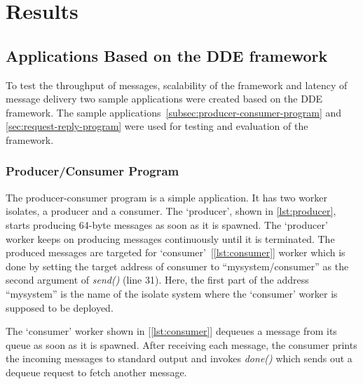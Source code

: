 \chapter{Results}
\label{chapter:results}

\section{Applications Based on the DDE framework}
\label{sec:result-applications}
  To test the throughput of messages, scalability of the framework and latency of message delivery two sample applications were created based on the DDE framework. The sample applications~\autoref{subsec:producer-consumer-program} and
  \autoref{sec:request-reply-program} were used for testing and evaluation of the framework.

\subsection{Producer/Consumer Program}
\label{subsec:producer-consumer-program}
  The producer-consumer program is a simple application. It has two worker isolates, a producer and a consumer. The ‘producer’, shown in \autoref{lst:producer}, starts producing 64-byte messages as soon as it is spawned. The ‘producer’ worker keeps on producing messages continuously until it is terminated. The produced messages are targeted for ‘consumer’~[\autoref{lst:consumer}] worker which is done by setting the target address of consumer to “mysystem/consumer” as the second argument of \emph{send()} (line 31). Here, the first part of the address “mysystem” is the name of the isolate system where the ‘consumer’ worker is supposed to be deployed.

  The ‘consumer’ worker shown in [\autoref{lst:consumer}] dequeues a message from its queue as soon as it is spawned.  After receiving each message, the consumer prints the incoming messages to standard output and invokes \emph{done()} which sends out a dequeue request to fetch another message.

